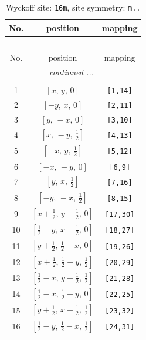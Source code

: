 \documentclass[fleqn,8pt]{jsarticle}
\begin{document}
\renewcommand{\arraystretch}{1.2}
\begin{longtable}{ccc}
\caption{Wyckoff site: {\tt 16m}, site symmetry: {\tt m..}}
 \\
 \hline \hline
No. & position & mapping \\ \hline \endfirsthead

\multicolumn{2}{l}{\tablename\ \thetable{}} \\
 \hline \hline
No. & position & mapping \\ \hline \endhead

 \hline \hline
\multicolumn{2}{r}{\footnotesize\it continued ...} \\ \endfoot

 \hline \hline
\multicolumn{2}{r}{} \\ \endlastfoot

1 & $\left[ x,\, y,\, 0 \right]$ & {\tt [1,14]} \\ \hline
2 & $\left[ - y,\, x,\, 0 \right]$ & {\tt [2,11]} \\ \hline
3 & $\left[ y,\, - x,\, 0 \right]$ & {\tt [3,10]} \\ \hline
4 & $\left[ x,\, - y,\, \frac{1}{2} \right]$ & {\tt [4,13]} \\ \hline
5 & $\left[ - x,\, y,\, \frac{1}{2} \right]$ & {\tt [5,12]} \\ \hline
6 & $\left[ - x,\, - y,\, 0 \right]$ & {\tt [6,9]} \\ \hline
7 & $\left[ y,\, x,\, \frac{1}{2} \right]$ & {\tt [7,16]} \\ \hline
8 & $\left[ - y,\, - x,\, \frac{1}{2} \right]$ & {\tt [8,15]} \\ \hline
9 & $\left[ x + \frac{1}{2},\, y + \frac{1}{2},\, 0 \right]$ & {\tt [17,30]} \\ \hline
10 & $\left[ \frac{1}{2} - y,\, x + \frac{1}{2},\, 0 \right]$ & {\tt [18,27]} \\ \hline
11 & $\left[ y + \frac{1}{2},\, \frac{1}{2} - x,\, 0 \right]$ & {\tt [19,26]} \\ \hline
12 & $\left[ x + \frac{1}{2},\, \frac{1}{2} - y,\, \frac{1}{2} \right]$ & {\tt [20,29]} \\ \hline
13 & $\left[ \frac{1}{2} - x,\, y + \frac{1}{2},\, \frac{1}{2} \right]$ & {\tt [21,28]} \\ \hline
14 & $\left[ \frac{1}{2} - x,\, \frac{1}{2} - y,\, 0 \right]$ & {\tt [22,25]} \\ \hline
15 & $\left[ y + \frac{1}{2},\, x + \frac{1}{2},\, \frac{1}{2} \right]$ & {\tt [23,32]} \\ \hline
16 & $\left[ \frac{1}{2} - y,\, \frac{1}{2} - x,\, \frac{1}{2} \right]$ & {\tt [24,31]} \\
\end{longtable}
\end{document}
